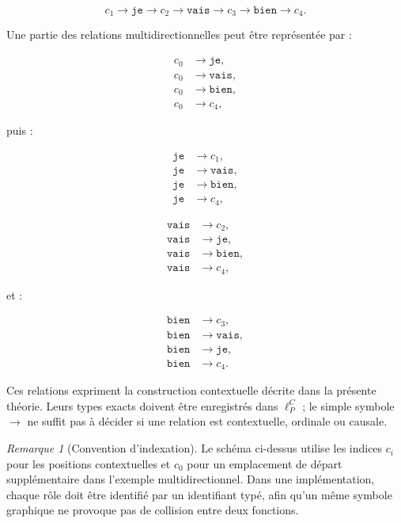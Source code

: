 \documentclass[11pt,a4paper,oneside]{book}
\theoremstyle{remark}
\newtheorem{remarque}[definition]{Remarque}
\begin{document}
\[
c_1\to\texttt{je}\to c_2
\to\texttt{vais}\to c_3
\to\texttt{bien}\to c_4.
\]

Une partie des relations multidirectionnelles peut être représentée
par :

\[
\begin{aligned}
c_0&\to\texttt{je},\\
c_0&\to\texttt{vais},\\
c_0&\to\texttt{bien},\\
c_0&\to c_4,
\end{aligned}
\]

puis :

\[
\begin{aligned}
\texttt{je}&\to c_1,\\
\texttt{je}&\to\texttt{vais},\\
\texttt{je}&\to\texttt{bien},\\
\texttt{je}&\to c_4,
\end{aligned}
\]

\[
\begin{aligned}
\texttt{vais}&\to c_2,\\
\texttt{vais}&\to\texttt{je},\\
\texttt{vais}&\to\texttt{bien},\\
\texttt{vais}&\to c_4,
\end{aligned}
\]

et :

\[
\begin{aligned}
\texttt{bien}&\to c_3,\\
\texttt{bien}&\to\texttt{vais},\\
\texttt{bien}&\to\texttt{je},\\
\texttt{bien}&\to c_4.
\end{aligned}
\]

Ces relations expriment la construction contextuelle décrite
dans la présente théorie. Leurs types exacts doivent être enregistrés
dans \(\ell_P^C\) ; le simple symbole \(\to\) ne suffit pas à décider
si une relation est contextuelle, ordinale ou causale.

\begin{remarque}[Convention d'indexation]
Le schéma ci-dessus utilise les indices \(c_i\) pour les positions
contextuelles et \(c_0\) pour un emplacement de départ supplémentaire
dans l'exemple multidirectionnel. Dans une implémentation, chaque
rôle doit être identifié par un identifiant typé, afin qu'un même
symbole graphique ne provoque pas de collision entre deux fonctions.
\end{remarque}
\end{document}
